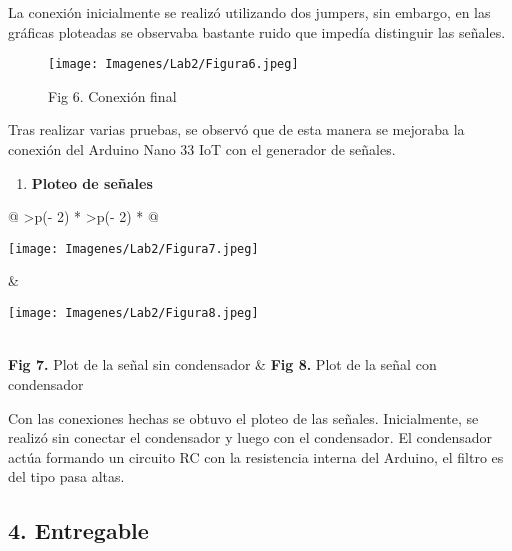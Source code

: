 \documentclass[
  letterpaper,
  DIV=11,
  numbers=noendperiod]{scrartcl}
\providecommand{\tightlist}{%
  \setlength{\itemsep}{0pt}\setlength{\parskip}{0pt}}\usepackage{longtable,booktabs,array}
\begin{document}
La conexión inicialmente se realizó utilizando dos jumpers, sin embargo,
en las gráficas ploteadas se observaba bastante ruido que impedía
distinguir las señales.

\begin{figure}[H]

{\centering \texttt{[image: Imagenes/Lab2/Figura6.jpeg]}

}

\caption{Fig 6. Conexión final}

\end{figure}%

Tras realizar varias pruebas, se observó que de esta manera se mejoraba
la conexión del Arduino Nano 33 IoT con el generador de señales.

\begin{enumerate}
\def\labelenumi{\arabic{enumi}.}
\setcounter{enumi}{7}
\tightlist
\item
  \textbf{Ploteo de señales}
\end{enumerate}

\begin{longtable}[]{@{}
  >{\centering\arraybackslash}p{(\columnwidth - 2\tabcolsep) * }
  >{\centering\arraybackslash}p{(\columnwidth - 2\tabcolsep) * }@{}}
\toprule\noalign{}
\begin{minipage}[b]{\linewidth}\centering
\texttt{[image: Imagenes/Lab2/Figura7.jpeg]}
\end{minipage} & \begin{minipage}[b]{\linewidth}\centering
\texttt{[image: Imagenes/Lab2/Figura8.jpeg]}
\end{minipage} \\
\midrule\noalign{}
\endhead
\bottomrule\noalign{}
\endlastfoot
\textbf{Fig 7.} Plot de la señal sin condensador & \textbf{Fig 8.} Plot
de la señal con condensador \\
\end{longtable}

Con las conexiones hechas se obtuvo el ploteo de las señales.
Inicialmente, se realizó sin conectar el condensador y luego con el
condensador. El condensador actúa formando un circuito RC con la
resistencia interna del Arduino, el filtro es del tipo pasa altas.

\subsection{4. Entregable}\label{entregable}
\end{document}
